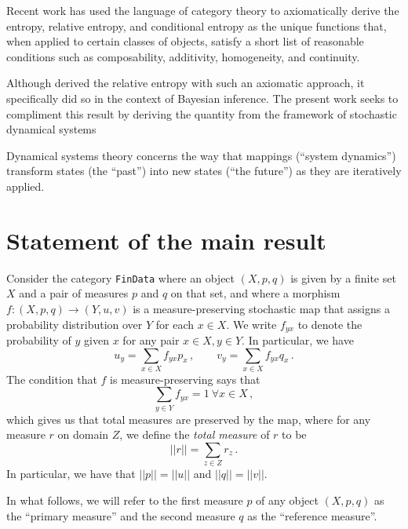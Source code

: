 \documentclass{article}
\begin{document}
Recent work \cite{baezCharacterizationEntropyTerms2011, baezBayesianCharacterizationRelative2014, fullwoodInformationLossStochastic2021} has used the language of category theory to axiomatically derive the entropy, relative entropy, and conditional entropy as the unique functions that, when applied to certain classes of objects, satisfy a short list of reasonable conditions such as composability, additivity, homogeneity, and continuity.

Although \cite{baezBayesianCharacterizationRelative2014} derived the relative entropy with such an axiomatic approach, it specifically did so in the context of Bayesian inference. The present work seeks to compliment this result by deriving the quantity from the framework of stochastic dynamical systems

Dynamical systems theory concerns the way that mappings (``system dynamics'') transform states (the ``past'') into new states (``the future'') as they are iteratively applied. 

\section{Statement of the main result}
Consider the category \texttt{FinData} where an object $(X, p, q)$ is given by a finite set $X$ and a pair of measures $p$ and $q$ on that set, and where a morphism $f:(X, p, q) \rightarrow (Y, u, v)$ is a measure-preserving stochastic map that assigns a probability distribution over $Y$ for each $x\in X$. We write $f_{yx}$ to denote the probability of $y$ given $x$ for any pair $x\in X, y\in Y$. In particular, we have
$$
u_y = \sum_{x\in X} f_{yx}p_x\,,
\qquad v_y = \sum_{x\in X} f_{yx}q_x\,.
$$
The condition that $f$ is measure-preserving says that 
$$
    \sum_{y\in Y} f_{yx} = 1 \ \forall x\in X\,,
$$
which gives us that total measures are preserved by the map, where for any measure $r$ on domain $Z$, we define the \textit{total measure} of $r$ to be
$$
||r|| = \sum_{z\in Z} r_z\,.
$$
In particular, we have that $||p|| = ||u||$ and $||q|| = ||v||$.

In what follows, we will refer to the first measure $p$ of any object $(X, p, q)$ as the ``primary measure'' and the second measure $q$ as the ``reference measure''.
\end{document}
